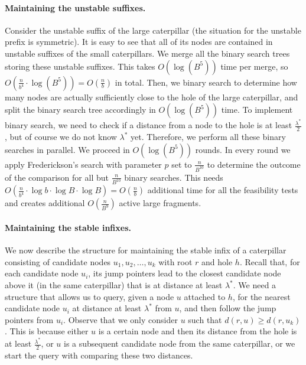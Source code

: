 \documentclass[11pt,a4paper]{article}
\theoremstyle{definition}
\theoremstyle{remark}
\begin{document}
\paragraph{Maintaining the unstable suffixes.}
Consider the unstable suffix of the large caterpillar (the situation for the unstable prefix is
symmetric). It is easy to see that all of its nodes are contained in unstable suffixes of
the small caterpillars. We merge all the binary search trees storing these unstable suffixes.
This takes $O(\log (B^5))$ time per merge, so $O(\frac{n}{b^{4}}\cdot \log (B^5))=O(\frac{n}{b})$ in total.
Then, we binary search to determine how many nodes are actually sufficiently close to the hole of the large caterpillar, and
 split the binary search tree accordingly in $O(\log (B^{5}))$ time. To implement binary search, we need to
check if a distance from a node to the hole is at least $\frac{\lambda^{*}}{2}$, but of course we
do not know $\lambda^{*}$ yet. Therefore, we perform all these binary searches in parallel. We proceed in $O(\log (B^{5}))$ rounds. In every round we apply Frederickson's search
with parameter $p$ set to $\frac{n}{B^{10}}$ to determine  the outcome of the comparison for all
but $\frac{n}{B^{10}}$ binary searches. This needs
$O(\frac{n}{b^{4}}\cdot\log b\cdot\log B\cdot\log B)=O(\frac{n}{b})$ additional time for
all the feasibility tests and creates additional $O(\frac{n}{B^{9}})$ active large fragments.

\paragraph{Maintaining the stable infixes.}
We now describe the structure for maintaining the stable infix of a caterpillar consisting of candidate nodes $u_{1},u_{2},\ldots,u_{k}$ with root $r$ and hole $h$. 
Recall that, for each candidate node $u_i$, its jump pointers lead to the closest candidate node above it (in the same caterpillar) that is at distance at least $\lambda ^*$. 
We need a structure that allows us to query, given a node $u$ attached to $h$, for the nearest candidate node $u_{i}$ at distance at least $\lambda^{*}$ from $u$, and then follow the jump pointers from $u_{i}$.
%
Observe that we only consider $u$ such that $d(r,u)\geq d(r,u_{k})$. This is because either $u$ is a certain node and then its distance from the hole is at least
$\frac{\lambda^{*}}{2}$, or $u$ is a subsequent candidate node from the same caterpillar,
or we start the query with comparing these two distances.
\end{document}
